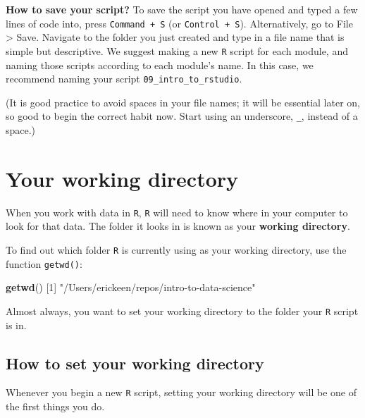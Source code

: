 \documentclass[
]{book}
\newenvironment{Shaded}{\begin{snugshade}}{\end{snugshade}}
\newcommand{\DecValTok}[1]{\textcolor[rgb]{0.00,0.00,0.81}{#1}}
\newcommand{\KeywordTok}[1]{\textcolor[rgb]{0.13,0.29,0.53}{\textbf{#1}}}
\newcommand{\NormalTok}[1]{#1}
\newcommand{\StringTok}[1]{\textcolor[rgb]{0.31,0.60,0.02}{#1}}
\begin{document}
\textbf{How to save your script?} To save the script you have opened and typed a few lines of code into, press \texttt{Command\ +\ S} (or \texttt{Control\ +\ S}). Alternatively, go to File \textgreater{} Save. Navigate to the folder you just created and type in a file name that is simple but descriptive. We suggest making a new \texttt{R} script for each module, and naming those scripts according to each module's name. In this case, we recommend naming your script \texttt{09\_intro\_to\_rstudio}.

(It is good practice to avoid spaces in your file names; it will be essential later on, so good to begin the correct habit now. Start using an underscore, \texttt{\_}, instead of a space.)

\hypertarget{your-working-directory}{%
\section*{Your working directory}\label{your-working-directory}}

When you work with data in \texttt{R}, \texttt{R} will need to know where in your computer to look for that data. The folder it looks in is known as your \textbf{working directory}.

To find out which folder \texttt{R} is currently using as your working directory, use the function \texttt{getwd()}:

\begin{Shaded}
\begin{Highlighting}[]
\KeywordTok{getwd}\NormalTok{()}
\NormalTok{[}\DecValTok{1}\NormalTok{] }\StringTok{"/Users/erickeen/repos/intro-to-data-science"}
\end{Highlighting}
\end{Shaded}

Almost always, you want to set your working directory to the folder your \texttt{R} script is in.

\hypertarget{how-to-set-your-working-directory}{%
\subsection*{How to set your working directory}\label{how-to-set-your-working-directory}}

Whenever you begin a new \texttt{R} script, setting your working directory will be one of the first things you do.
\end{document}
